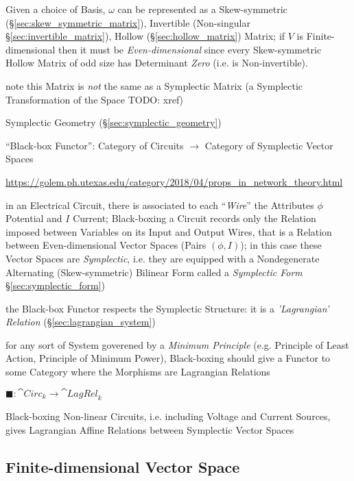 Given a choice of Basis, $\omega$ can be represented as a Skew-symmetric
(\S\ref{sec:skew_symmetric_matrix}), Invertible (Non-singular
\S\ref{sec:invertible_matrix}), Hollow (\S\ref{sec:hollow_matrix}) Matrix; if
$V$ is Finite-dimensional then it must be \emph{Even-dimensional} since every
Skew-symmetric Hollow Matrix of odd size has Determinant \emph{Zero} (i.e. is
Non-invertible).

note this Matrix is \emph{not} the same as a Symplectic Matrix (a Symplectic
Transformation of the Space TODO: xref)

\fist Symplectic Geometry (\S\ref{sec:symplectic_geometry})

``Black-box Functor'': Category of Circuits $\rightarrow$ Category of
Symplectic Vector Spaces %

\url{https://golem.ph.utexas.edu/category/2018/04/props_in_network_theory.html}

in an Electrical Circuit, there is associated to each ``\emph{Wire}'' the
Attributes $\phi$ Potential and $I$ Current; Black-boxing a Circuit records
only the Relation imposed between Variables on its Input and Output Wires, that
is a Relation between Even-dimensional Vector Spaces (Pairs $(\phi,I)$); in
this case these Vector Spaces are \emph{Symplectic}, i.e. they are equipped
with a Nondegenerate Alternating (Skew-symmetric) Bilinear Form called a
\emph{Symplectic Form} \S\ref{sec:symplectic_form})

the Black-box Functor respects the Symplectic Structure: it is a
\emph{'Lagrangian' Relation} (\S\ref{sec:lagrangian_system})

for any sort of System goverened by a \emph{Minimum Principle} (e.g. Principle
of Least Action, Principle of Minimum Power), Black-boxing should give a
Functor to some Category where the Morphisms are Lagrangian Relations

$\blacksquare : \cat{Circ}_k \rightarrow \cat{LagRel}_k$

Black-boxing Non-linear Circuits, i.e. including Voltage and Current Sources,
gives Lagrangian Affine Relations between Symplectic Vector Spaces



\subsection{Finite-dimensional Vector Space}
\label{sec:finite_dimensional_vectorspace}

